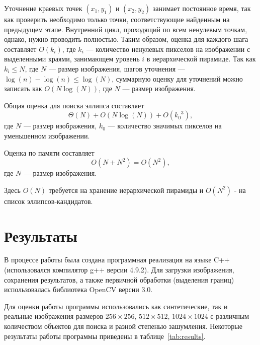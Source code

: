 Уточнение краевых точек \((x_1,y_1)\) и \((x_2,y_2)\) занимает постоянное время, так как проверить необходимо только точки, соответствующие найденным на предыдущем этапе.
Внутренний цикл, проходящий по всем ненулевым точкам, однако, нужно проводить полностью. 
Таким образом, оценка для каждого шага составляет \(O(k_i)\), где \(k_i\) --- количество ненулевых пикселов на изображении с выделенными краями, занимающем уровень \(i\) в иерархической пирамиде.
Так как \(k_i \le N\), где $N$ --- размер изображения, шагов уточнения --- \(\log(n) - \log(n) \le \log(N)\), суммарную оценку для уточнений можно записать как
$O(N\log(N))$, где $N$ --- размер изображения.

Общая оценка для поиска эллипса составляет \[\Theta(N) + O(N\log(N)) + O({k_0}^3),\]
где $N$ --- размер изображения, $k_0$ --- количество значимых пикселов на уменьшенном изображении.

Оценка по памяти составляет $$O(N + N^2) = O(N^2),$$ где $N$ --- размер изображения. 

Здесь \(O(N)\) требуется на хранение иерархической пирамиды и \(O(N^2)\) - на список эллипсов-кандидатов.
\section{Результаты}
В процессе работы была создана программная реализация на языке C++ (использовался компилятор g++ версии 4.9.2). 
Для загрузки изображения, сохранения результатов, а также первичной обработки (выделения границ) использовалась библиотека OpenCV версии 3.0.

Для оценки работы программы использовались как синтетические, так и реальные изображения размеров $256\times256$, $512\times512$, $1024\times1024$ с различным количеством объектов для поиска и разной степенью зашумления.
Некоторые результаты работы программы приведены в таблице~\ref{tab:results}.

